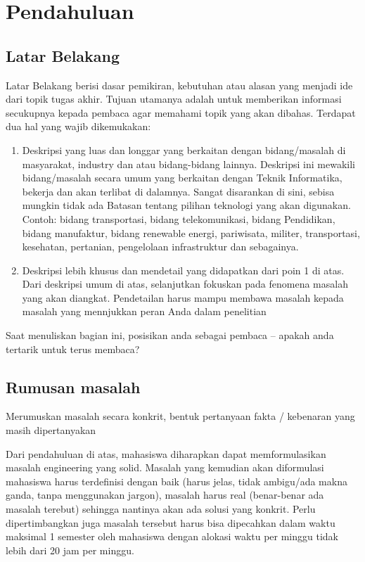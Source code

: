 \newpage
\chapter{Pendahuluan} \label{Bab I}

\section{Latar Belakang} \label{I.Latar Belakang}
Latar Belakang berisi dasar pemikiran, kebutuhan atau alasan yang menjadi ide dari topik tugas akhir. Tujuan utamanya adalah untuk memberikan informasi secukupnya kepada pembaca agar memahami topik yang akan dibahas. Terdapat dua hal yang wajib dikemukakan: \par 
\begin{enumerate}
	\item Deskripsi yang luas dan longgar yang berkaitan dengan bidang/masalah di masyarakat, industry dan atau bidang-bidang lainnya. Deskripsi ini mewakili bidang/masalah secara umum yang berkaitan dengan Teknik Informatika, bekerja dan akan terlibat di dalamnya. Sangat disarankan di sini, sebisa mungkin tidak ada Batasan tentang pilihan teknologi yang akan digunakan. Contoh: bidang transportasi, bidang telekomunikasi, bidang Pendidikan, bidang manufaktur, bidang renewable energi, pariwisata, militer, transportasi, kesehatan, pertanian, pengelolaan infrastruktur dan sebagainya.
	\item Deskripsi lebih khusus dan mendetail yang didapatkan dari poin 1 di atas. Dari deskripsi umum di atas, selanjutkan fokuskan pada fenomena masalah yang akan diangkat. Pendetailan harus mampu membawa masalah kepada masalah yang mennjukkan peran Anda dalam penelitian 
\end{enumerate} \par

Saat menuliskan bagian ini, posisikan anda sebagai pembaca – apakah anda tertarik untuk terus membaca? \par

\section{Rumusan masalah} \label{I.Rumusan Masalah}
\indent Merumuskan masalah secara konkrit, bentuk pertanyaan fakta / kebenaran yang masih dipertanyakan \par

Dari pendahuluan di atas, mahasiswa diharapkan dapat memformulasikan masalah engineering yang solid. Masalah yang kemudian akan diformulasi mahasiswa harus terdefinisi dengan baik (harus jelas, tidak ambigu/ada makna ganda, tanpa menggunakan jargon), masalah harus real (benar-benar ada masalah terebut) sehingga nantinya akan ada solusi yang konkrit. Perlu dipertimbangkan juga masalah tersebut harus bisa dipecahkan dalam waktu maksimal 1 semester oleh mahasiswa dengan alokasi waktu per minggu tidak lebih dari 20 jam per minggu. \par

